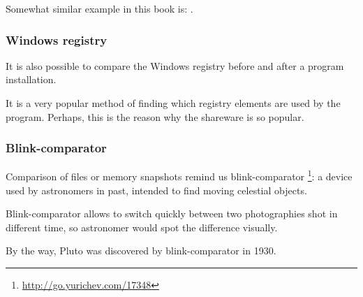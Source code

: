 Somewhat similar example in this book is: .


\subsubsection{Windows registry}

It is also possible to compare the Windows registry before and after a program installation.

It is a very popular method of finding which registry elements are used by the program.
Perhaps, this is the reason why the  shareware is so popular.

\subsubsection{Blink-comparator}

Comparison of files or memory snapshots remind us blink-comparator
\footnote{\url{http://go.yurichev.com/17348}}:
a device used by astronomers in past, intended to find moving celestial objects.

Blink-comparator allows to switch quickly between two photographies shot in different time,
so astronomer would spot the difference visually.

By the way, Pluto was discovered by blink-comparator in 1930.
